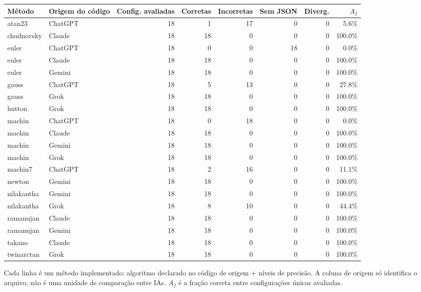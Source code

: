 \scriptsize
\begin{tabular}{p{2.0cm}p{1.45cm}rrrrrr}
\toprule
Método & Origem do código & Config. avaliadas & Corretas & Incorretas & Sem JSON & Diverg. & $A_f$\\
\midrule
atan23 & ChatGPT & 18 & 1 & 17 & 0 & 0 & 5.6\%\\
chudnovsky & Claude & 18 & 18 & 0 & 0 & 0 & 100.0\%\\
euler & ChatGPT & 18 & 0 & 0 & 18 & 0 & 0.0\%\\
euler & Claude & 18 & 18 & 0 & 0 & 0 & 100.0\%\\
euler & Gemini & 18 & 18 & 0 & 0 & 0 & 100.0\%\\
gauss & ChatGPT & 18 & 5 & 13 & 0 & 0 & 27.8\%\\
gauss & Grok & 18 & 18 & 0 & 0 & 0 & 100.0\%\\
hutton & Grok & 18 & 18 & 0 & 0 & 0 & 100.0\%\\
machin & ChatGPT & 18 & 0 & 18 & 0 & 0 & 0.0\%\\
machin & Claude & 18 & 18 & 0 & 0 & 0 & 100.0\%\\
machin & Gemini & 18 & 18 & 0 & 0 & 0 & 100.0\%\\
machin & Grok & 18 & 18 & 0 & 0 & 0 & 100.0\%\\
machin7 & ChatGPT & 18 & 2 & 16 & 0 & 0 & 11.1\%\\
newton & Gemini & 18 & 18 & 0 & 0 & 0 & 100.0\%\\
nilakantha & Gemini & 18 & 18 & 0 & 0 & 0 & 100.0\%\\
nilakantha & Grok & 18 & 8 & 10 & 0 & 0 & 44.4\%\\
ramanujan & Claude & 18 & 18 & 0 & 0 & 0 & 100.0\%\\
ramanujan & Gemini & 18 & 18 & 0 & 0 & 0 & 100.0\%\\
takano & Claude & 18 & 18 & 0 & 0 & 0 & 100.0\%\\
twinarctan & Grok & 18 & 18 & 0 & 0 & 0 & 100.0\%\\
\bottomrule
\end{tabular}
\par\smallskip\footnotesize Cada linha é um método implementado: algoritmo declarado no código de origem + níveis de precisão. A coluna de origem só identifica o arquivo, não é uma unidade de comparação entre IAs. $A_f$ é a fração correta entre configurações únicas avaliadas.\normalsize
